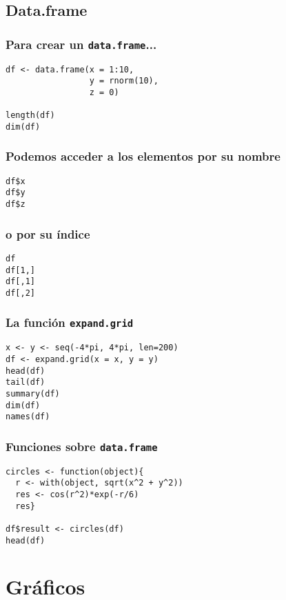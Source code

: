 \documentclass[bigger]{beamer}
\begin{document}
\subsection{Data.frame}
\label{sec-4-2}
\begin{frame}[fragile]
\frametitle{Para crear un \texttt{data.frame}...}
\label{sec-4-2-1}


\lstset{language=R}
\begin{lstlisting}
df <- data.frame(x = 1:10,
                 y = rnorm(10),
                 z = 0)

length(df)
dim(df)
\end{lstlisting}
\end{frame}
\begin{frame}[fragile]
\frametitle{Podemos acceder a los elementos por su nombre}
\label{sec-4-2-2}


\lstset{language=R}
\begin{lstlisting}
df$x
df$y
df$z
\end{lstlisting}
\end{frame}
\begin{frame}[fragile]
\frametitle{o por su índice}
\label{sec-4-2-3}


\lstset{language=R}
\begin{lstlisting}
df
df[1,]
df[,1]
df[,2]
\end{lstlisting}
\end{frame}
\begin{frame}[fragile]
\frametitle{La función \texttt{expand.grid}}
\label{sec-4-2-4}



\lstset{language=R}
\begin{lstlisting}
x <- y <- seq(-4*pi, 4*pi, len=200)
df <- expand.grid(x = x, y = y)
head(df)
tail(df)
summary(df)
dim(df)
names(df)
\end{lstlisting}
\end{frame}
\begin{frame}[fragile]
\frametitle{Funciones sobre \texttt{data.frame}}
\label{sec-4-2-5}



\lstset{language=R}
\begin{lstlisting}
circles <- function(object){
  r <- with(object, sqrt(x^2 + y^2))
  res <- cos(r^2)*exp(-r/6)
  res}

df$result <- circles(df)
head(df)
\end{lstlisting}
\end{frame}
\section{Gráficos}
\label{sec-5}
\end{document}
